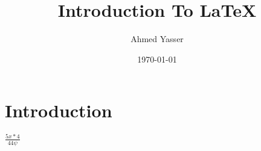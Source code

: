 \documentclass[options]{article}
\title{Introduction To LaTeX}
\author{Ahmed Yasser}
\date{\today}
\begin{document}
\maketitle

\section{Introduction}

$ \frac{5x*4}{44\psi} $
\end{document}

